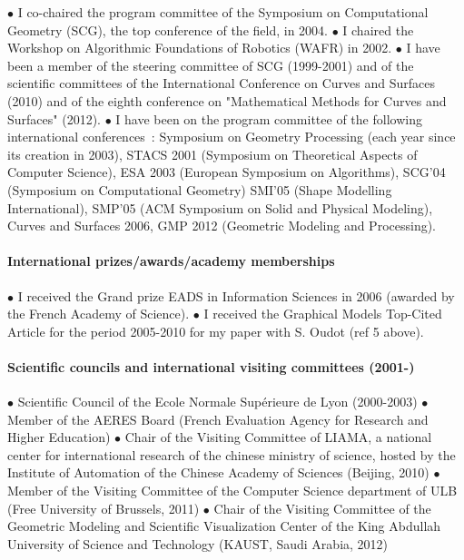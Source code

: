 
$\bullet$ I co-chaired the program committee of the  Symposium on Computational Geometry (SCG), the top conference of the field,  in 2004.
$\bullet$ 
I chaired the Workshop on Algorithmic Foundations of Robotics (WAFR) in 2002.
$\bullet$ 
I have been a member of the steering committee of SCG  (1999-2001) and of the scientific committees of the International Conference on Curves and Surfaces (2010) and of  the eighth conference on "Mathematical Methods for Curves and Surfaces" (2012).
$\bullet$ 
I have been on the program committee of  the following international conferences~: Symposium on Geometry Processing (each year since its creation in 2003), 
STACS 2001 (Symposium on Theoretical Aspects of Computer Science),
ESA 2003 (European Symposium on Algorithms),
SCG'04 (Symposium on Computational Geometry)
SMI'05 (Shape Modelling International),
SMP'05 (ACM Symposium on Solid and Physical Modeling),
Curves and Surfaces 2006,
GMP 2012 (Geometric Modeling 
and Processing).

\paragraph{International prizes/awards/academy memberships} \mbox{}

$\bullet$ I received the Grand prize EADS in Information Sciences in 2006 (awarded by the French Academy of Science).  $\bullet$ I received the Graphical Models Top-Cited Article for the period 2005-2010 for  my paper with S. Oudot (ref 5 above).

\paragraph{Scientific councils and international visiting committees (2001-)} \mbox{}


$\bullet$  Scientific Council of the Ecole Normale Sup\'erieure de Lyon (2000-2003)
$\bullet$  Member of the AERES Board (French Evaluation Agency for
  Research and Higher Education)
$\bullet$  Chair of the Visiting Committee of LIAMA, a  national center for international research of the chinese ministry of science, hosted by the Institute of Automation of the Chinese Academy of Sciences  (Beijing, 2010)
$\bullet$  Member of the Visiting Committee of the Computer Science department of ULB (Free University of Brussels, 2011)
$\bullet$    Chair of the Visiting Committee of the Geometric Modeling and Scientific Visualization  Center of the King Abdullah University of Science and Technology (KAUST, Saudi Arabia, 2012)



